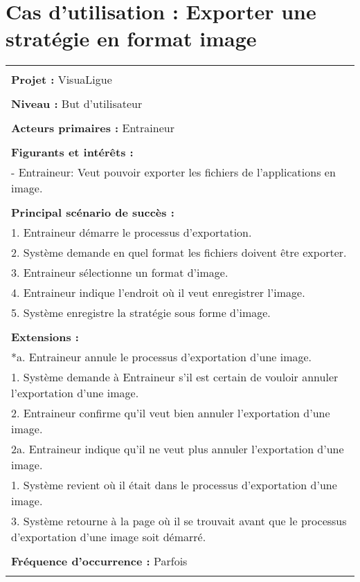 \section{Cas d'utilisation : Exporter une stratégie en format image}
\begin{longtable}{|p{16cm}|}
	\hline
	\\
	\textbf{Projet :} VisuaLigue\\
	\\
	\textbf{Niveau :} But d'utilisateur\\
	\\
	\textbf{Acteurs primaires :} Entraineur\\
	\\
	\textbf{Figurants et intérêts :} \\
	- Entraineur: Veut pouvoir exporter les fichiers de l'applications en image.\\
	\\
	\textbf{Principal scénario de succès :}\\
	1. Entraineur démarre le processus d'exportation.\\
	2. Système demande en quel format les fichiers doivent être exporter.\\
	3. Entraineur sélectionne un format d'image.\\
	4. Entraineur indique l'endroit où il veut enregistrer l'image.\\
	5. Système enregistre la stratégie sous forme d'image.\\
	\\
	\textbf{Extensions :}\\
	*a. Entraineur annule le processus d'exportation d'une image.\\
	\hspace{1cm}1. Système demande à Entraineur s'il est certain de vouloir annuler l'exportation d'une image.\\
	\hspace{1cm}2. Entraineur confirme qu'il veut bien annuler l'exportation d'une image.\\
	\hspace{2cm}2a. Entraineur indique qu'il ne veut plus annuler l'exportation d'une image.\\
	\hspace{3cm}1. Système revient où il était dans le processus d'exportation d'une image.\\
	\hspace{1cm}3. Système retourne à la page où il se trouvait avant que le processus d'exportation d'une image soit démarré.\\
	\\
	\textbf{Fréquence d'occurrence :} Parfois\\
	\\
	\hline
\end{longtable}

